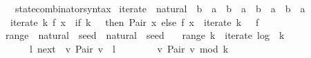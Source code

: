 \begin{isabellebody}
\isadelimdocument
%
\endisadelimdocument
%
\isatagdocument
%
\isamarkuptrue%
%
\endisatagdocument
{\isafolddocument}%
%
\isadelimdocument
%
\endisadelimdocument
{}\isamarkupfalse%
\isanewline
\ \ \ state{\isacharunderscore}{\kern0pt}combinator{\isacharunderscore}{\kern0pt}syntax\isanewline
{}\isanewline
\isanewline
{}\isamarkupfalse%
\ iterate\ {\isacharcolon}{\kern0pt}{\isacharcolon}{\kern0pt}\ {\isachardoublequoteopen}natural\ {\isasymRightarrow}\ {\isacharparenleft}{\kern0pt}{\isacharprime}{\kern0pt}b\ {\isasymRightarrow}\ {\isacharprime}{\kern0pt}a\ {\isasymRightarrow}\ {\isacharprime}{\kern0pt}b\ {\isasymtimes}\ {\isacharprime}{\kern0pt}a{\isacharparenright}{\kern0pt}\ {\isasymRightarrow}\ {\isacharprime}{\kern0pt}b\ {\isasymRightarrow}\ {\isacharprime}{\kern0pt}a\ {\isasymRightarrow}\ {\isacharprime}{\kern0pt}b\ {\isasymtimes}\ {\isacharprime}{\kern0pt}a{\isachardoublequoteclose}\ \isanewline
\ \ {\isachardoublequoteopen}iterate\ k\ f\ x\ {\isacharequal}{\kern0pt}\ {\isacharparenleft}{\kern0pt}if\ k\ {\isacharequal}{\kern0pt}\ {}\ then\ Pair\ x\ else\ f\ x\ {\isasymcirc}{\isasymrightarrow}\ iterate\ {\isacharparenleft}{\kern0pt}k\ {\isacharminus}{\kern0pt}\ {}{\isacharparenright}{\kern0pt}\ f{\isacharparenright}{\kern0pt}{\isachardoublequoteclose}\isanewline
\isanewline
{}\isamarkupfalse%
\ range\ {\isacharcolon}{\kern0pt}{\isacharcolon}{\kern0pt}\ {\isachardoublequoteopen}natural\ {\isasymRightarrow}\ seed\ {\isasymRightarrow}\ natural\ {\isasymtimes}\ seed{\isachardoublequoteclose}\ \isanewline
\ \ {\isachardoublequoteopen}range\ k\ {\isacharequal}{\kern0pt}\ iterate\ {\isacharparenleft}{\kern0pt}log\ {}{}{}{}{}{}{}{}{}{}\ k{\isacharparenright}{\kern0pt}\isanewline
\ \ \ \ \ \ {\isacharparenleft}{\kern0pt}{\isasymlambda}l{\isachardot}{\kern0pt}\ next\ {\isasymcirc}{\isasymrightarrow}\ {\isacharparenleft}{\kern0pt}{\isasymlambda}v{\isachardot}{\kern0pt}\ Pair\ {\isacharparenleft}{\kern0pt}v\ {\isacharplus}{\kern0pt}\ l\ {\isacharasterisk}{\kern0pt}\ {}{}{}{}{}{}{}{}{}{}{\isacharparenright}{\kern0pt}{\isacharparenright}{\kern0pt}{\isacharparenright}{\kern0pt}\ {}\isanewline
\ \ \ \ {\isasymcirc}{\isasymrightarrow}\ {\isacharparenleft}{\kern0pt}{\isasymlambda}v{\isachardot}{\kern0pt}\ Pair\ {\isacharparenleft}{\kern0pt}v\ mod\ k{\isacharparenright}{\kern0pt}{\isacharparenright}{\kern0pt}{\isachardoublequoteclose}\isanewline

\end{isabellebody}
